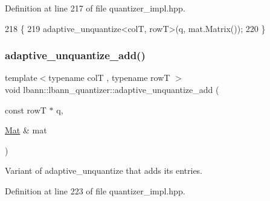 Definition at line 217 of file quantizer\+\_\+impl.\+hpp.


\begin{DoxyCode}
218                                \{
219   adaptive\_unquantize<colT, rowT>(q, mat.Matrix());
220 \}
\end{DoxyCode}
\mbox{\label{classlbann_1_1lbann__quantizer_a1f63f7be2e227a48ebaa25056e6f85bc}} 
\subsubsection{\texorpdfstring{adaptive\+\_\+unquantize\+\_\+add()}{adaptive\_unquantize\_add()}}
{\footnotesize\ttfamily template$<$typename colT , typename rowT $>$ \\
void lbann\+::lbann\+\_\+quantizer\+::adaptive\+\_\+unquantize\+\_\+add (\begin{DoxyParamCaption}\item[{const rowT $\ast$}]{q,  }\item[{\hyperlink{base_8hpp_a68f11fdc31b62516cb310831bbe54d73}{Mat} \&}]{mat }\end{DoxyParamCaption})\hspace{0.3cm}{\ttfamily [private]}}

Variant of adaptive\+\_\+unquantize that adds its entries. 

Definition at line 223 of file quantizer\+\_\+impl.\+hpp.


